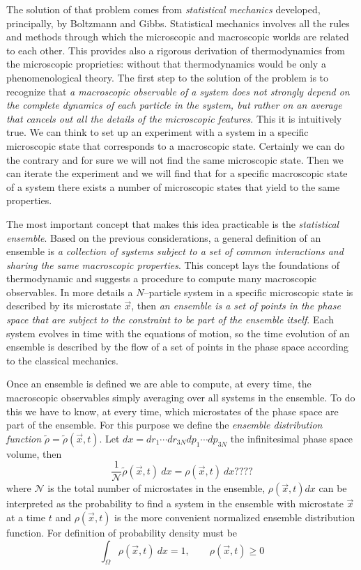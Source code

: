 The solution of that problem comes from \textit{statistical mechanics} developed, principally, by Boltzmann and
Gibbs. Statistical mechanics involves all the rules and methods through which the microscopic and macroscopic
worlds are related to each other. This provides also a rigorous derivation of thermodynamics from the microscopic
proprieties: without that thermodynamics would be only a phenomenological theory. The first step to the solution
of the problem is to recognize that \textit{a macroscopic observable of a system does not strongly depend on the
complete dynamics of each particle in the system, but rather on an average that cancels out all the details of
the microscopic features}. This it is intuitively true. We can think to set up an experiment with a system in a
specific microscopic state that corresponds to a macroscopic state. Certainly we can do the contrary and for sure
we will not find the same microscopic state. Then we can iterate the experiment and we will find that for a
specific macroscopic state of a system there exists a number of microscopic states that yield to the same
properties.

The most important concept that makes this idea practicable is the \textit{statistical ensemble}. Based on the
previous considerations, a general definition of an ensemble is \textit{a collection of systems subject to a set
of common interactions and sharing the same macroscopic properties}. This concept lays the foundations of
thermodynamic and suggests a procedure to compute many macroscopic observables. In more details a
$N$--particle system in a specific microscopic state is described by its microstate $\vec x$, then \textit{an
ensemble is a set of points in the phase space that are subject to the constraint to be part of the ensemble
itself}. Each system evolves in time with the equations of motion, so the time evolution of an ensemble is
described by the flow of a set of points in the phase space according to the classical mechanics.

Once an ensemble is defined we are able to compute, at every time, the macroscopic observables simply averaging
over all systems in the ensemble. To do this we have to know, at every time, which microstates of the phase space
are part of the ensemble. For this purpose we define the \textit{ensemble distribution function}
$\tilde\rho = \tilde\rho(\vec x,t)$. Let $dx = dr_1\cdots dr_{3N} dp_1 \cdots dp_{3N}$ the infinitesimal phase
space volume, then
\begin{equation*}
	\frac{1}{\mathcal{N}}\tilde\rho(\vec x, t)\ dx = \rho(\vec x, t)\ dx ????
\end{equation*}
where $\mathcal{N}$ is the total number of microstates in the ensemble, $\rho(\vec x, t)dx$ can be interpreted as
the probability to find a system in the ensemble with microstate $\vec x$ at a time $t$ and $\rho(\vec x, t)$ is
the more convenient normalized ensemble distribution function. For definition of probability density must be
\begin{equation*}
	\int_{\Omega} \rho(\vec x, t)\ dx = 1, \qquad \rho(\vec x, t) \ge 0
\end{equation*}

